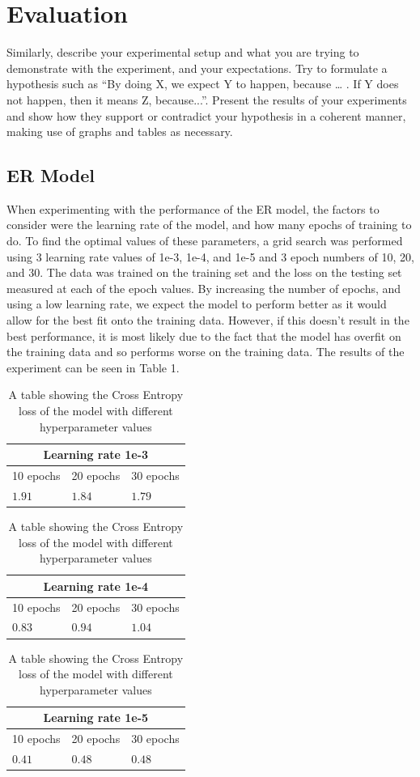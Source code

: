 \documentclass[11pt]{article}
\begin{document}
\section{Evaluation}
Similarly, describe your experimental setup and what you are trying to demonstrate with the experiment, and your expectations. Try to formulate a hypothesis such as ``By doing X, we expect Y to happen, because … . If Y does not happen, then it means Z, because...''. Present the results of your experiments and show how they support or contradict your hypothesis in a coherent manner, making use of graphs and tables as necessary. 

\subsection{ER Model}

When experimenting with the performance of the ER model, the factors to consider were the learning rate of the model, and how many epochs of training to do. To find the optimal values of these parameters, a grid search was performed using 3 learning rate values of 1e-3, 1e-4, and 1e-5 and 3 epoch numbers of 10, 20, and 30. The data was trained on the training set and the loss on the testing set measured at each of the epoch values. By increasing the number of epochs, and using a low learning rate, we expect the model to perform better as it would allow for the best fit onto the training data. However, if this doesn't result in the best performance, it is most likely due to the fact that the model has overfit on the training data and so performs worse on the training data. The results of the experiment can be seen in Table 1.

\begin{table}[H]
    \centering
    \caption{A table showing the Cross Entropy loss of the model with different hyperparameter values}
    \begin{tabularx}{0.48\textwidth}{|X X X|} 
      \hline
      \multicolumn{3}{|c|}{Learning rate 1e-3} \\ \hline 
      10 epochs & 20 epochs & 30 epochs \\ \hline
      $1.91$&$1.84$ &$1.79$ \\ \hline
    \end{tabularx}
    \begin{tabularx}{0.48\textwidth}{|X X X|} 
        \hline
        \multicolumn{3}{|c|}{Learning rate 1e-4} \\ \hline 
        10 epochs & 20 epochs & 30 epochs \\ \hline
        $0.83$&$0.94$ &$1.04$ \\ \hline
      \end{tabularx}
      \begin{tabularx}{0.48\textwidth}{|X X X|} 
        \hline
        \multicolumn{3}{|c|}{Learning rate 1e-5} \\ \hline 
        10 epochs & 20 epochs & 30 epochs \\ \hline
        $0.41$&$0.48$ &$0.48$ \\ \hline
    \end{tabularx}
\end{table}
\end{document}

